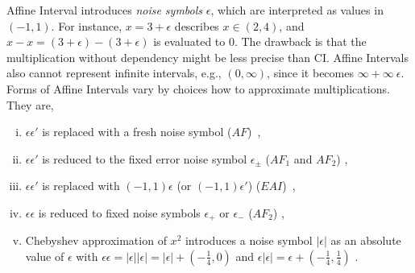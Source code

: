 \documentclass[runningheads,a4paper,oribibl]{llncs}
\newcommand{\suppress}[1]{} %
\begin{document}
Affine Interval introduces \emph{noise symbols} $\epsilon$, 
which are interpreted as values in $(-1,1)$. 
For instance, $x = 3 + \epsilon$ describes $x \in (2,4)$, and 
$x - x = (3 + \epsilon) - (3 + \epsilon)$ is evaluated to $0$. 
The drawback is that the multiplication without dependency might be less precise than CI.
Affine Intervals also cannot represent infinite intervals, e.g., $(0,\infty)$, 
since it becomes $\infty + \infty~\epsilon$. 
Forms of Affine Intervals vary by choices how to approximate multiplications. They are,
\begin{enumerate}[(i)]
\item $\epsilon \epsilon'$ is replaced with a fresh noise symbol 
($AF$)~\cite{Comba93affinearithmetic}, 
\item $\epsilon \epsilon'$ is reduced to the fixed error noise symbol 
$\epsilon_{\pm}$ ($AF_1$ and $AF_2$) \cite{Messine_extensionsof},
\item $\epsilon \epsilon'$ is replaced with $(-1,1) \epsilon$ 
(or $(-1,1) \epsilon'$) ($EAI$)~\cite{Ngoc:2009:ORE:1685167.1685421},
\item $\epsilon \epsilon$ is reduced to fixed noise symbols 
$\epsilon_+$ or $\epsilon_{-}$ ($AF_2$) \cite{Messine_extensionsof}, 
\item Chebyshev approximation of $x^2$ introduces a noise symbol $|\epsilon|$ 
as an absolute value of $\epsilon$ with 
$\epsilon \epsilon = |\epsilon| |\epsilon| = |\epsilon| + (-\frac{1}{4}, 0)$ and
$\epsilon |\epsilon| = \epsilon + (-\frac{1}{4}, \frac{1}{4})$ \cite{VanKhanh201227}. 
\end{enumerate} 

\suppress{
\begin{remark}
For Affine Intervals, \emph{sensitivity}~\cite{ngocsefm} of a variable
is a possible range of the absolute value of the coefficient of its corresponding $\epsilon$. 


Note that Affine Interval works only for bounded intervals. 
For instance, $\infty + \infty \epsilon$ represents $(-\infty,\infty)$, which says nothing. 
Narrowing intervals as an incremental search (Section~\ref{sec:incsearch})
partially depends on this fact. 
That is, if $\pm \infty$ is contained in an interval, first give finite upper/lower bounds and
search within these bounds using an Affine Interval.
If UNSAT is concluded, then enlarge to the whole intervals using CI. 
\end{remark}
}
\end{document}
